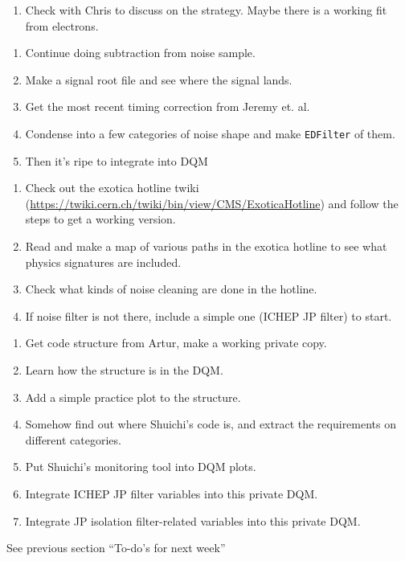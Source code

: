 
\begin{enumerate}
\item Check with Chris to discuss on the strategy.  Maybe there is a working fit from electrons.
\end{enumerate}


\begin{enumerate}
\item Continue doing subtraction from noise sample.
\item Make a signal root file and see where the signal lands.
\item Get the most recent timing correction from Jeremy et. al.
\item Condense into a few categories of noise shape and make \texttt{EDFilter} of them.
\item Then it's ripe to integrate into DQM
\end{enumerate}


\begin{enumerate}
\item Check out the exotica hotline twiki (\url{https://twiki.cern.ch/twiki/bin/view/CMS/ExoticaHotline}) and follow the steps to get a working version.
\item Read and make a map of various paths in the exotica hotline to see what physics signatures are included.
\item Check what kinds of noise cleaning are done in the hotline.
\item If noise filter is not there, include a simple one (ICHEP JP filter) to start.
\end{enumerate}


\begin{enumerate}
\item Get code structure from Artur, make a working private copy.
\item Learn how the structure is in the DQM.
\item Add a simple practice plot to the structure.
\item Somehow find out where Shuichi's code is, and extract the requirements on different categories.
\item Put Shuichi's monitoring tool into DQM plots.
\item Integrate ICHEP JP filter variables into this private DQM.
\item Integrate JP isolation filter-related variables into this private DQM.
\end{enumerate}




See previous section ``To-do's for next week''

